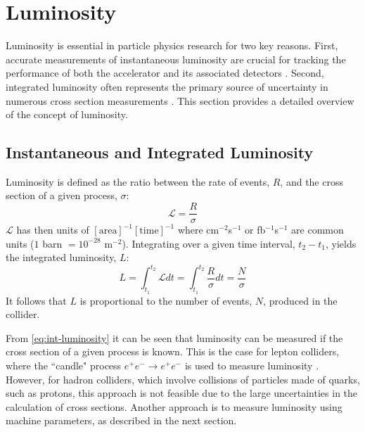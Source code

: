 \section{Luminosity}
\label{sec:luminosity}

Luminosity is essential in particle physics research for two key reasons. First, accurate measurements of instantaneous luminosity are crucial for tracking the performance of both the accelerator and its associated detectors \cite{PhysRevAccelBeams.21.102801}. Second, integrated luminosity often represents the primary source of uncertainty in numerous cross section measurements \cite{cms2022measurement, sirunyan2019measurement}. This section provides a detailed overview of the concept of luminosity.

\subsection{Instantaneous and Integrated Luminosity}

Luminosity is defined as the ratio between the rate of events, $R$, and the cross section of a given process, $\sigma$:
\begin{equation}
    \label{eq:inst-luminosity}
    \mathcal{L} = \frac{R}{\sigma}
\end{equation}
$\mathcal{L}$ has then units of $[\mathrm{area}]^{-1} [\mathrm{time}]^{-1}$ where cm$^{-2}$s$^{-1}$ or fb$^{-1}$s$^{-1}$ are common units ($1$ barn  $= 10^{-28}$ m$^{-2}$). Integrating over a given time interval, $t_2 - t_1$, yields the integrated luminosity, $L$:
\begin{equation}
    \label{eq:int-luminosity}
    L = \int_{t_1}^{t_2} \mathcal{L} dt = \int_{t_1}^{t_2} \frac{R}{\sigma} dt = \frac{N}{\sigma}
\end{equation}
It follows that $L$ is proportional to the number of events, $N$, produced in the collider.

From \autoref{eq:int-luminosity} it can be seen that luminosity can be measured if the cross section of a given process is known. This is the case for lepton colliders, where the ``candle" process $e^+ e^- \rightarrow e^+ e^-$ is used to measure luminosity \cite{Burkhardt:1056691}. However, for hadron colliders, which involve collisions of particles made of quarks, such as protons, this approach is not feasible due to the large uncertainties in the calculation of cross sections. Another approach is to measure luminosity using machine parameters, as described in the next section.

